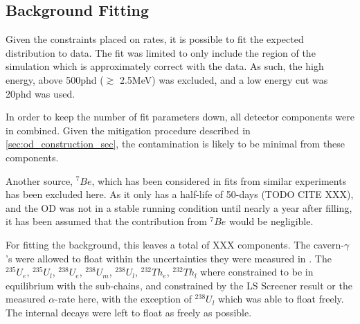 \subsection{Background Fitting}
\par
Given the constraints placed on rates, it is possible to fit the expected distribution to data. 
The fit was limited to only include the region of the simulation which is approximately correct with the data. 
As such, the high energy, above 500phd ($\gtrsim$ 2.5MeV) was excluded, and a low energy cut was 20phd was used.
\par
In order to keep the number of fit parameters down, all detector components were in combined.
Given the mitigation procedure described in \autoref{sec:od_construction_sec}, the contamination is likely to be minimal from these components.
\par
Another source, ${}^{7}Be$, which has been considered in fits from similar experiments has been excluded here.
As it only has a half-life of 50-days (TODO CITE XXX), and the OD was not in a stable running condition until nearly a year after filling, it has been assumed that the contribution from ${}^{7}Be$ would be negligible.
\par
For fitting the background, this leaves a total of XXX components.
The cavern-$\gamma$'s were allowed to float within the uncertainties they were measured in \cite{LZ_Gamma_Ray_Background_ref}.
The ${}^{235}U_e$, ${}^{235}U_l$, ${}^{238}U_e$, ${}^{238}U_m$, ${}^{238}U_l$, ${}^{232}Th_e$, ${}^{232}Th_l$ where constrained to be in equilibrium with the sub-chains, and constrained by the LS Screener result or the measured $\alpha$-rate here, with the exception of ${}^{238}U_l$ which was able to float freely.
The internal decays were left to float as freely as possible.



